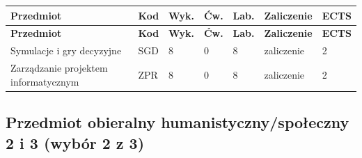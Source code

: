 \documentclass[12pt,a4paper]{article}
\newcommand{\thdrule}{\noalign{\global\setlength{\extrarowheight}{0pt}}}
\newcommand{\thdend}{\noalign{\global\setlength{\extrarowheight}{4pt}}}
\begin{document}
{\scriptsize
\begin{longtable}{m{5.5cm}m{0.8cm}m{1cm}m{1cm}m{1cm}m{1.7cm}m{0.7cm}}
\thdrule\toprule
\rowcolor{pjatkRed}
{\color{white}\footnotesize\textbf{\vphantom{Ag}Przedmiot}} & {\color{white}\footnotesize\textbf{\vphantom{Ag}Kod}} & {\color{white}\footnotesize\textbf{\vphantom{Ag}Wyk.}} & {\color{white}\footnotesize\textbf{\vphantom{Ag}Ćw.}} & {\color{white}\footnotesize\textbf{\vphantom{Ag}Lab.}} & {\color{white}\footnotesize\textbf{\vphantom{Ag}Zaliczenie}} & {\color{white}\footnotesize\textbf{\vphantom{Ag}ECTS}} \\
\midrule\thdend
\endfirsthead
\thdrule\toprule
\rowcolor{pjatkRed}
{\color{white}\footnotesize\textbf{\vphantom{Ag}Przedmiot}} & {\color{white}\footnotesize\textbf{\vphantom{Ag}Kod}} & {\color{white}\footnotesize\textbf{\vphantom{Ag}Wyk.}} & {\color{white}\footnotesize\textbf{\vphantom{Ag}Ćw.}} & {\color{white}\footnotesize\textbf{\vphantom{Ag}Lab.}} & {\color{white}\footnotesize\textbf{\vphantom{Ag}Zaliczenie}} & {\color{white}\footnotesize\textbf{\vphantom{Ag}ECTS}} \\
\midrule\thdend
\endhead
\rowcolor{tableRowLight} Symulacje i gry decyzyjne & SGD & 8 & 0 & 8 & {\scriptsize zaliczenie} & 2 \\
\rowcolor{tableRowAlt} Zarządzanie projektem informatycznym & ZPR & 8 & 0 & 8 & {\scriptsize zaliczenie} & 2 \\
\bottomrule
\end{longtable}}

\subsection*{Przedmiot obieralny humanistyczny/społeczny 2 i 3 (wybór 2 z 3)}
\end{document}
